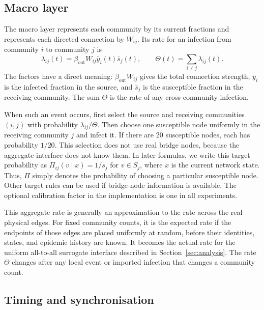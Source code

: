 \documentclass[a4paper,fleqn]{cas-sc}
\newcommand{\ibar}{\bar{y}}
\newcommand{\sbar}{\bar{s}}
\begin{document}
\subsection{Macro layer}
\label{sec:macro}

The macro layer represents each community by its current fractions and represents each directed connection by $W_{ij}$. Its rate for an infection from community $i$ to community $j$ is
\begin{equation}
\label{eq:macro_rate}
\lambda_{ij}(t)=\beta_{\mathrm{out}}W_{ij}\ibar_i(t)\sbar_j(t),
\qquad
\Theta(t)=\sum_{i\neq j}\lambda_{ij}(t).
\end{equation}
The factors have a direct meaning: $\beta_{\mathrm{out}}W_{ij}$ gives the total connection strength, $\ibar_i$ is the infected fraction in the source, and $\sbar_j$ is the susceptible fraction in the receiving community. The sum $\Theta$ is the rate of any cross-community infection.

When such an event occurs, first select the source and receiving communities $(i,j)$ with probability $\lambda_{ij}/\Theta$. Then choose one susceptible node uniformly in the receiving community $j$ and infect it. If there are 20 susceptible nodes, each has probability $1/20$. This selection does not use real bridge nodes, because the aggregate interface does not know them. In later formulas, we write this target probability as $\Pi_{ij}(v\mid x)=1/s_j$ for $v\in S_j$, where $x$ is the current network state. Thus, $\Pi$ simply denotes the probability of choosing a particular susceptible node. Other target rules can be used if bridge-node information is available. The optional calibration factor in the implementation is one in all experiments.

This aggregate rate is generally an approximation to the rate across the real physical edges. For fixed community counts, it is the expected rate if the endpoints of those edges are placed uniformly at random, before their identities, states, and epidemic history are known. It becomes the actual rate for the uniform all-to-all surrogate interface described in Section~\ref{sec:analysis}. The rate $\Theta$ changes after any local event or imported infection that changes a community count.

\subsection{Timing and synchronisation}
\label{sec:timing}
\end{document}
